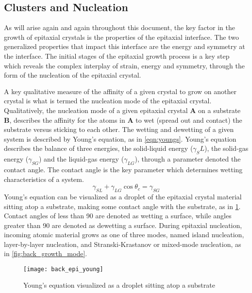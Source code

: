 \subsection{Clusters and Nucleation}
As will arise again and again throughout this document, the key factor in the growth of epitaxial crystals is the properties of the epitaxial interface. The two generalized properties that impact this interface are the energy and symmetry at the interface. The initial stages of the epitaxial growth process is a key step which reveals the complex interplay of strain, energy and symmetry, through the form of the nucleation of the epitaxial crystal.

A key qualitative measure of the affinity of a given crystal to grow on another crystal is what is termed the nucleation mode of the epitaxial crystal. Qualitatively, the nucleation mode of a given epitaxial crystal \textbf{A} on a substrate \textbf{B}, describes the affinity for the atoms in \textbf{A} to wet (spread out and contact) the substrate versus sticking to each other. The wetting and dewetting of a given system is described by Young's equation, as in \cref{eqn:youngs}. Young's equation describes the balance of three energies, the solid-liquid energy ($\gamma_SL$), the solid-gas energy ($\gamma_{SG}$) and the liquid-gas energy ($\gamma_{LG}$), through a parameter denoted the contact angle. The contact angle is the key parameter which determines wetting characteristics of a system.
\begin{equation}
\gamma_{SL} + \gamma_{LG} \cos{\theta_c} = \gamma_{SG} \label{eqn:youngs}
\end{equation}
Young's equation can be visualized as a droplet of the epitaxial crystal material sitting atop a substrate, making some contact angle with the substrate, as in \cref{fig:back_epi_young}. Contact angles of less than 90\degree{} are denoted as wetting a surface, while angles greater than 90\degree{} are denoted as dewetting a surface. During epitaxial nucleation, incoming atomic material grows as one of three modes, named island nucleation, layer-by-layer nucleation, and Stranski-Krastanov or mixed-mode nucleation, as in \cref{fig:back_growth_mode}. 
\begin{figure}
    \centering
    \texttt{[image: back\_epi\_young]}
    \caption[Young's equation]{\label{fig:back_epi_young}Young's equation visualized as a droplet sitting atop a substrate\cite{wikipedia}}
\end{figure}

